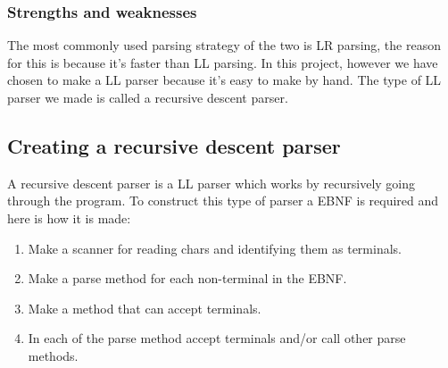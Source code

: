 		\subsubsection*{Strengths and weaknesses}
			The most commonly used parsing strategy of the two is LR parsing, the reason for this is because it's faster than LL parsing.
			In this project, however we have chosen to make a LL parser because it's easy to make by hand. The type of LL parser we made is called
			a recursive descent parser.
			
	\subsection{Creating a recursive descent parser}
		A recursive descent parser is a LL parser which works by recursively going through the program.
		To construct this type of parser a EBNF is required and here is how it is made:
		\begin{enumerate}
			\item Make a scanner for reading chars and identifying them as terminals.
			\item Make a parse method for each non-terminal in the EBNF.
			\item Make a method that can accept terminals.
			\item In each of the parse method accept terminals and/or call other parse methods.
		\end{enumerate}		
	
		
		
		